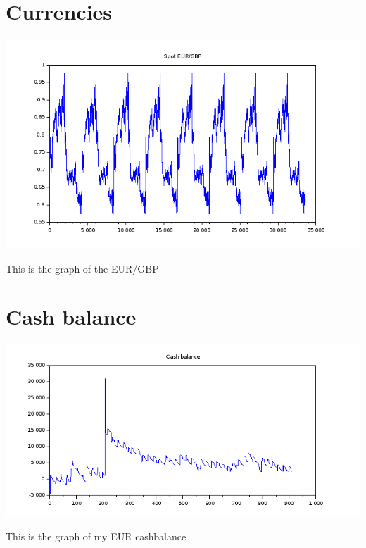 \documentclass[8pt]{article} %
\begin{document}
\section{Currencies}


\includegraphics[scale=0.6]{Scilab-currencies.png}

This is the graph of the EUR/GBP 

\section{Cash balance}
\includegraphics[scale=0.6]{Scilab-cashBalance.png}

This is the graph of my EUR cashbalance 
\end{document}
